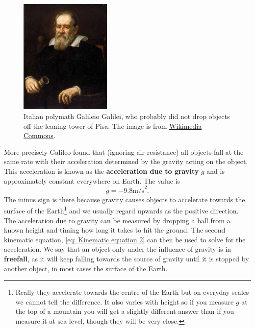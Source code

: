 \documentclass[a4paper,12pt]{book}
\begin{document}
\begin{figure}[ht]
    \centering
    \includegraphics[width=0.4\textwidth]{figures/Galileo.jpg}
    \caption{Italian polymath Galileio Galilei, who probably did not drop objects off the leaning tower of Pisa. The image is from \href{https://commons.wikimedia.org/wiki/File:Justus_Sustermans_-_Portrait_of_Galileo_Galilei,_1636.jpg}{Wikimedia Commons}.}
\end{figure}

More precisely Galileo found that (ignoring air resistance) all objects fall at the same rate with their acceleration determined by the gravity acting on the object. This acceleration is known as the \textbf{acceleration due to gravity} $g$ and is approximately constant everywhere on Earth. The value is 
\begin{equation*}
    g=-9.8\text{m/s}^{2}.
\end{equation*}
The minus sign is there because gravity causes objects to accelerate towards the surface of the Earth\footnote{Really they accelerate towards the centre of the Earth but on everyday scales we cannot tell the difference. It also varies with height so if you measure $g$ at the top of a mountain you will get a slightly different answer than if you measure it at sea level, though they will be very close. } and we usually regard upwards as the positive direction.\\

The acceleration due to gravity can be measured by dropping a ball from a known height and timing how long it takes to hit the ground. The second kinematic equation, \cref{eq: Kinematic equation 2} can then be used to solve for the acceleration.  We say that an object only under the influence of gravity is in \textbf{freefall}, as it will keep falling towards the source of gravity until it is stopped by another object, in most cases the surface of the Earth.
\end{document}
